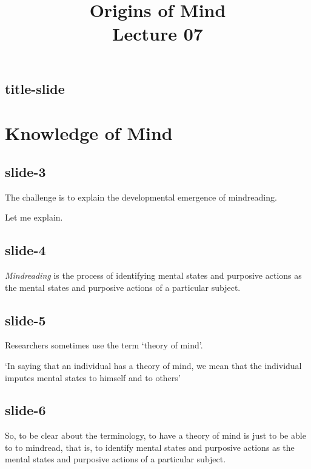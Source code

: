 \documentclass[12pt,\papersize]{extarticle}
\begin{document}
\setlength\footnotesep{1em}










\title {Origins of Mind \\ Lecture 07}



\maketitle

\subsection{title-slide}


\section{Knowledge of Mind}

\subsection{slide-3}
The challenge is to explain the developmental emergence of mindreading.

Let me explain.

\subsection{slide-4}
\textit{Mindreading} is
the process of
identifying mental states and purposive actions
as the mental states and purposive actions of a particular subject.

\subsection{slide-5}
Researchers sometimes use the term ‘theory of mind’.

‘In saying that an individual has a theory of mind, we mean that the individual imputes mental states to himself and to others’
\citep[p.\ 515]{premack_does_1978}

\subsection{slide-6}
So, to be clear about the terminology, to have a theory of mind is just to be able to
to mindread,
that is, to identify mental states and purposive actions
as the mental states and purposive actions of a particular subject.
\end{document}
